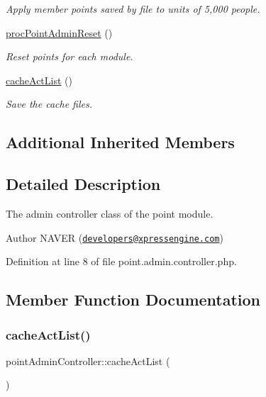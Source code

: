 \begin{DoxyCompactItemize}
\begin{DoxyCompactList}\small\item\em Apply member points saved by file to units of 5,000 people. \end{DoxyCompactList}\item 
\hyperlink{classpointAdminController_ab5131a2b0dd2fe07086034dceb9ae26f}{proc\+Point\+Admin\+Reset} ()
\begin{DoxyCompactList}\small\item\em Reset points for each module. \end{DoxyCompactList}\item 
\hyperlink{classpointAdminController_aa1c2fcf15f52f425ff5e36337f8d5c4f}{cache\+Act\+List} ()
\begin{DoxyCompactList}\small\item\em Save the cache files. \end{DoxyCompactList}\end{DoxyCompactItemize}
\subsection*{Additional Inherited Members}


\subsection{Detailed Description}
The admin controller class of the point module. 

\begin{DoxyAuthor}{Author}
N\+A\+V\+ER (\href{mailto:developers@xpressengine.com}{\tt developers@xpressengine.\+com}) 
\end{DoxyAuthor}


Definition at line 8 of file point.\+admin.\+controller.\+php.



\subsection{Member Function Documentation}
\hypertarget{classpointAdminController_aa1c2fcf15f52f425ff5e36337f8d5c4f}{}\label{classpointAdminController_aa1c2fcf15f52f425ff5e36337f8d5c4f} 
\subsubsection{\texorpdfstring{cache\+Act\+List()}{cacheActList()}}
{\footnotesize\ttfamily point\+Admin\+Controller\+::cache\+Act\+List (\begin{DoxyParamCaption}{ }\end{DoxyParamCaption})}



